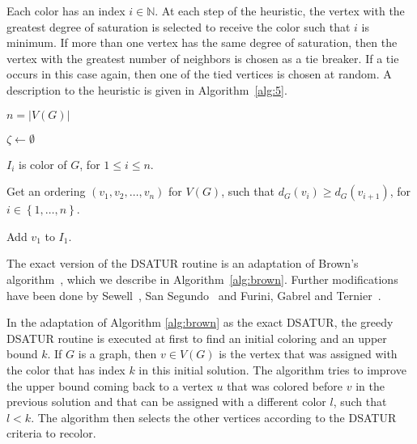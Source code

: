 \documentclass[fleqn,10pt]{SelfArx} %
\newcommand{\chaves}[1] {\ensuremath{{\left \{ {#1} \right \}}}}
\newcommand{\bN}{\ensuremath{\mathbb{N}}}
\begin{document}
	Each color has an index $i \in \bN$. At each step of the heuristic, the vertex with the greatest degree of
	saturation is selected to receive the color such that $i$ is minimum. If more than one vertex has the same degree of saturation, then the vertex with the greatest number of neighbors is
	chosen as a tie breaker. If a tie occurs in this case again, then one of the tied
	vertices is chosen at random. A description to the heuristic is given
	in Algorithm~\ref{alg:5}.
	
	\begin{algorithm}[!htb]
		\SetAlgoNoLine
		\justifying
		$n = |V(G)|$
		
		$\zeta \gets \emptyset$
		
		$I_i$ is color of $G$, for $1 \leq i \leq n$.
		
		Get an ordering $(v_1,v_2, \ldots,v_n)$ for $V(G)$, such that $d_G(v_i) \geq d_G(v_{i+1})$, for $i \in \chaves{1, \ldots,n}$.
		
		Add $v_1$ to $I_1$.
		
		
		\Return{$\zeta$}
		\caption{$\textsc{DSATUR(G)}$}\label{alg:5}
	\end{algorithm}
	
	The exact version of the \textsf{DSATUR} routine is an adaptation of Brown's
	algorithm~\cite{Brown1972}, which we describe in Algorithm~\ref{alg:brown}. Further modifications have been done by Sewell~\cite{Sewell98}, San Segundo~\cite{SanSegundo2012} and Furini, Gabrel and Ternier~\cite{Furini2017}.
	
	In the adaptation of Algorithm \ref{alg:brown} as the exact \textsf{DSATUR}, the greedy \textsf{DSATUR} routine is executed at first to find an initial coloring and
	an upper bound $k$. If $G$ is a graph, then $v \in V(G)$ is the vertex that was assigned with the
	color that has index $k$ in this initial solution. The algorithm tries to improve the
	upper bound coming back to a vertex $u$ that was colored before $v$ in the previous solution and that can be assigned with a different color $l$, such that $l < k$. The algorithm then
	selects the other vertices according to the \textsf{DSATUR} criteria to recolor.
	
\end{document}
